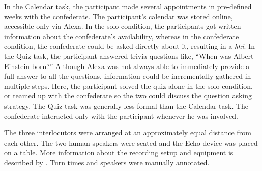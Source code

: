 In the Calendar task, the participant made several appointments in pre-defined weeks with the confederate.
The participant's calendar was stored online, accessible only via Alexa.
In the solo condition, the participants got written information about the confederate's availability, whereas in the confederate condition, the confederate could be asked directly about it, resulting in a \emph{\ac{hhi}}.
In the Quiz task, the participant answered trivia questions like, \enquote{When was Albert Einstein born?}
Although Alexa was not always able to immediately provide a full answer to all the questions, information could be incrementally gathered in multiple steps.
Here, the participant solved the quiz alone in the solo condition, or teamed up with the confederate so the two could discuss the question asking strategy.
The Quiz task was generally less formal than the Calendar task.
The confederate interacted only with the participant whenever he was involved.

The three interlocutors were arranged at an approximately equal distance from each other.
The two human speakers were seated and the Echo device was placed on a table.
More information about the recording setup and equipment is described by \citet{Siegert2018VACC}.
Turn times and speakers were manually annotated.

% 


